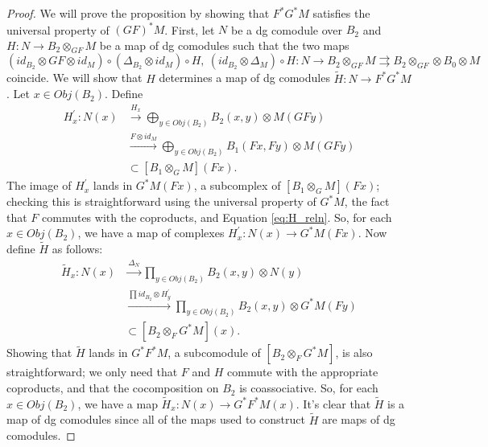 \begin{proof}
We will prove the proposition by showing that 
$F^*G^*M$ satisfies the universal property of 
$(GF)^*M$. First, let $N$ be a dg comodule over $B_2$ 
and $H: N \to B_2 \otimes_{GF} M$ be a map of 
dg comodules such that the two maps 
\begin{equation}\label{eq:H_reln}
(id_{B_2} \otimes GF \otimes id_M) \circ 
(\Delta_{B_2}\otimes id_M) \circ H, \>
(id_{B_2} \otimes \Delta_M) \circ H: 
N \to B_2 \otimes_{GF} M
\rightrightarrows 
B_2 \otimes_{GF} \otimes B_0 \otimes M
\end{equation}
coincide. We will show that $H$ determines a 
map of dg comodules $\tilde{H}: N \to F^*G^*M$. 
Let $x \in Obj(B_2)$. Define 
\begin{align*}
H^\prime_x: N(x)
&\xrightarrow{H_x}
\bigoplus \limits_{y \in Obj(B_2)}
  B_2(x,y) \otimes M(GFy)\\
&\xrightarrow{F \otimes id_M}
\bigoplus \limits_{y \in Obj(B_2)}
  B_1(Fx,Fy) \otimes M(GFy)\\
&\subset
[B_1 \otimes_G M](Fx).  
\end{align*}
The image of $H^\prime_x$ lands in 
$G^*M(Fx)$, a subcomplex of 
$[B_1 \otimes_G M](Fx)$; checking 
this is straightforward using the 
universal property of $G^*M$, the 
fact that $F$ commutes with the 
coproducts, and Equation \ref{eq:H_reln}. 
So, for 
each $x \in Obj(B_2)$, we have a map  
of complexes $H^\prime_x: N(x) \to 
G^*M(Fx)$. Now define $\tilde{H}$ as 
follows:
\begin{align*}
\tilde{H}_x: N(x) 
&\xrightarrow{\Delta_N}
\prod \limits_{y \in Obj(B_2)}
  B_2(x,y) \otimes N(y)\\
&\xrightarrow{\prod id_{B_2} \otimes H^\prime_y}  
\prod \limits_{y \in Obj(B_2)}
  B_2(x,y) \otimes G^*M(Fy)\\
&\subset
[B_2 \otimes_F G^*M](x).
\end{align*}
Showing that $\tilde{H}$ lands in 
$G^*F^*M$, a subcomodule of 
$[B_2 \otimes_F G^*M]$, is also 
straightforward; we only need that 
$F$ and $H$ commute with the appropriate 
coproducts, and that the cocomposition 
on $B_2$ is coassociative. So, for each 
$x \in Obj(B_2)$, we have a map 
$\tilde{H}_x: N(x) \to G^*F^*M(x)$. 
It's clear that $\tilde{H}$ is a map 
of dg comodules since all of the maps 
used to construct $\tilde{H}$ are maps 
of dg comodules.


\end{proof}

